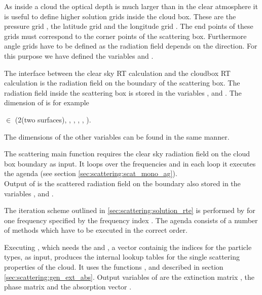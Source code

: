 As inside a cloud the optical depth is much larger than in the clear
atmosphere it is useful to define higher solution grids inside the
cloud box. These are the pressure grid
, the latitude grid  
and the longitude grid . The end points of
these grids must correspond to the corner points of the scattering
box. Furthermore angle grids have to be defined as the radiation
field depends on the direction. For this purpose we have defined the
variables  and .

The interface between the clear sky RT calculation and the cloudbox RT
calculation is the radiation field on the boundary of the scattering
box. The radiation field \StoVec inside the scattering box is stored
in the variables ,  and
. The dimension of   is for
example 
\begin{center}
   $\in$ (2(two surfaces), \ScaLat, \ScaLon, \ScaZa,
\ScaAa, \Frq).
\end{center}
The dimensions of the other variables can be found in the same manner.

\label{sec:scattering:main_function}

The scattering main function  requires the clear sky radiation 
field on the cloud box boundary as input.
It loops over the frequencies and in each loop it executes the agenda 
 (see section \ref{sec:scattering:scat_mono_ag}).\\
Output of  is the scattered radiation field on the
boundary also stored in the variables ,  and
.

\label{sec:scattering:scat_mono_ag}

The iteration scheme outlined in \ref{sec:scattering:solution_rte} is
performed by  for one frequency specified
by the frequency index . 
The agenda consists of a number of methods which have to be executed in
the correct order.


Executing , which needs the
 and , a vector containig the indices for the
particle types, as input, produces 
the internal lookup tables for the
single scattering properties of the cloud. It uses the functions   
, 
and  
described in section \ref{sec:scattering:gen_ext_abs}. 
Output variables of  are the
extinction matrix
, the phase matrix 
and the absorption vector .

